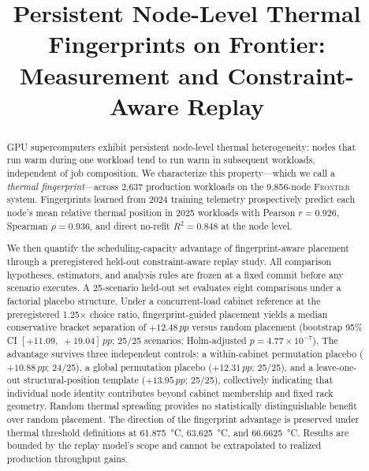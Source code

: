 \documentclass[acmsmall,screen,review,anonymous]{acmart}
\newcommand{\Frontier}{\textsc{Frontier}\xspace}
\newcommand{\pp}{\,pp\xspace}
\begin{document}
\title{Persistent Node-Level Thermal Fingerprints on Frontier:\\
       Measurement and Constraint-Aware Replay}

\begin{abstract}
GPU supercomputers exhibit persistent node-level thermal heterogeneity: nodes that run
warm during one workload tend to run warm in subsequent workloads, independent of job
composition.  We characterize this property---which we call a \emph{thermal
fingerprint}---across 2,637 production workloads on the 9,856-node \Frontier system.
Fingerprints learned from 2024 training telemetry prospectively predict each node's mean
relative thermal position in 2025 workloads with Pearson $r = 0.926$, Spearman
$\rho = 0.936$, and direct no-refit $R^2 = 0.848$ at the node level.

We then quantify the scheduling-capacity advantage of fingerprint-aware placement through
a preregistered held-out constraint-aware replay study.  All comparison hypotheses,
estimators, and analysis rules are frozen at a fixed commit before any scenario executes.
A 25-scenario held-out set evaluates eight comparisons under a factorial placebo structure.
Under a concurrent-load cabinet reference at the preregistered 1.25$\times$ choice ratio,
fingerprint-guided placement yields a median conservative bracket separation of
$+12.48\pp$ versus random placement (bootstrap 95\% CI $[+11.09,\;+19.04]\pp$; 25/25
scenarios; Holm-adjusted $p = 4.77 \times 10^{-7}$).  The advantage survives three
independent controls: a within-cabinet permutation placebo ($+10.88\pp$; 24/25), a global
permutation placebo ($+12.31\pp$; 25/25), and a leave-one-out structural-position template
($+13.95\pp$; 25/25), collectively indicating that individual node identity contributes
beyond cabinet membership and fixed rack geometry.  Random thermal spreading provides no
statistically distinguishable benefit over random placement.  The direction of the
fingerprint advantage is preserved under thermal threshold definitions at \SI{61.875}{\celsius},
\SI{63.625}{\celsius}, and \SI{66.6625}{\celsius}.  Results are bounded by the replay
model's scope and cannot be extrapolated to realized production throughput gains.
\end{abstract}


\maketitle
\end{document}
